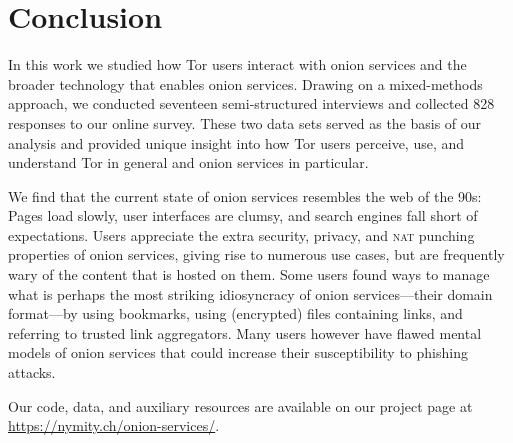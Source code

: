 \section{Conclusion}
\label{sec:conclusion}

In this work we studied how Tor users interact with onion services and the
broader technology that enables onion services.  Drawing on a mixed-methods
approach, we conducted seventeen semi-structured interviews and collected 828
responses to our online survey.  These two data sets served as the basis of our
analysis and provided unique insight into how Tor users perceive, use, and
understand Tor in general and onion services in particular.

We find that the current state of onion services resembles the web of the 90s:
Pages load slowly, user interfaces are clumsy, and search engines fall short of
expectations.  Users appreciate the extra security, privacy, and \textsc{nat}
punching properties of onion services, giving rise to numerous use cases, but
are frequently wary of the content that is hosted on them.  Some users found
ways to manage what is perhaps the most striking idiosyncracy of onion
services---their domain format---by using bookmarks, using (encrypted) files
containing links, and referring to trusted link aggregators.  Many users however
have flawed mental models of onion services that could increase their
susceptibility to phishing attacks.

Our code, data, and auxiliary resources are available on our project page at
\url{https://nymity.ch/onion-services/}.
